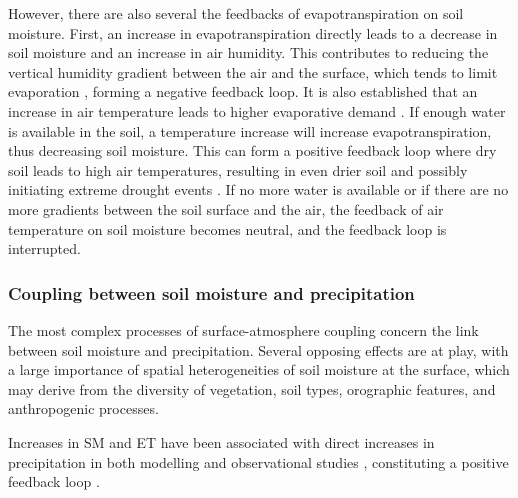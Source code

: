 However, there are also several the feedbacks of evapotranspiration on soil moisture. First, an increase in evapotranspiration directly leads to a decrease in soil moisture and an increase in air humidity. This contributes to reducing the vertical humidity gradient between the air and the surface, which tends to limit evaporation \citep{allen_crop_2000}, forming a negative feedback loop. It is also established that an increase in air temperature leads to higher evaporative demand \citep{jarvis_stomatal_1986}. If enough water is available in the soil, a temperature increase will increase evapotranspiration, thus decreasing soil moisture. This can form a positive feedback loop where dry soil leads to high air temperatures, resulting in even drier soil and possibly initiating extreme drought events \citep{quesada_asymmetric_2012}. If no more water is available or if there are no more gradients between the soil surface and the air, the feedback of air temperature on soil moisture becomes neutral, and the feedback loop is interrupted.

\subsubsection*{Coupling between soil moisture and precipitation}

The most complex processes of surface-atmosphere coupling concern the link between soil moisture and precipitation. Several opposing effects are at play, with a large importance of spatial heterogeneities of soil moisture at the surface, which may derive from the diversity of vegetation, soil types, orographic features, and anthropogenic processes.

Increases in SM and ET have been associated with direct increases in precipitation in both modelling and observational studies \citep{koster_observational_2003, guo_glace_2006, wei_dissecting_2012, findell_probability_2011}, constituting a positive feedback loop \citep[moisture recycling, as presented in ][]{eltahir_precipitation_1996}.

